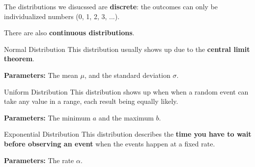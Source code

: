 %
\begin{frame}

The distributions we disucssed are \textbf{discrete}: the outcomes can only be
individualized numbers (0, 1, 2, 3, ...).  

\hfill

There are also \textbf{continuous distributions}.


\end{frame}
%

%
\begin{frame}{Normal Distribution}
This distribution usually shows up due to the \textbf{central limit theorem}.

\hfill

\textbf{Parameters:} The mean $\mu$, and the standard deviation $\sigma$.
\end{frame}
%

%
\begin{frame}{Uniform Distribution}
This distribution shows up when when a random event can take any value in a
range, each result being equally likely.

\hfill

\textbf{Parameters:} The minimum $a$ and the maximum $b$.
\end{frame}
%

%
\begin{frame}{Exponential Distribution}
This distribution describes the \textbf{time you have to wait before observing
an event} when the events happen at a fixed rate.

\hfill

\textbf{Parameters:} The rate $\alpha$.
\end{frame}
%


